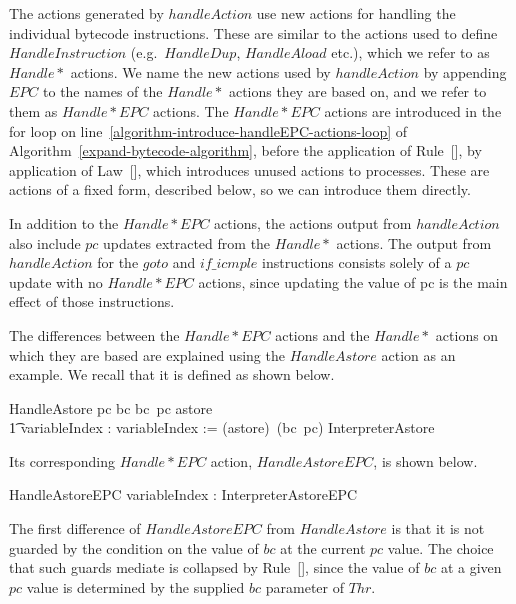 The actions generated by $handleAction$ use new actions for handling
the individual bytecode instructions.
These are similar to the actions used to define $HandleInstruction$
(e.g.\ $HandleDup$, $HandleAload$ etc.), which we refer to as
$Handle*$ actions.
We name the new actions used by $handleAction$ by appending $EPC$ to
the names of the $Handle*$ actions they are based on, and we refer to
them as $Handle{*}EPC$ actions.
The $Handle{*}EPC$ actions are introduced in the for loop on line~\ref{algorithm-introduce-handleEPC-actions-loop}
of Algorithm~\ref{expand-bytecode-algorithm}, before the application
of Rule~[], by application
of Law~[], which introduces unused actions
to processes.
These are actions of a fixed form, described below, so we can
introduce them directly.

In addition to the $Handle{*}EPC$ actions, the actions output from
$handleAction$ also include $pc$ updates extracted from the $Handle*$
actions.
The output from $handleAction$ for the $goto$ and $if\_icmple$
instructions consists solely of a $pc$ update with no $Handle{*}EPC$
actions, since updating the value of pc is the main effect of those
instructions.

The differences between the $Handle{*}EPC$ actions and the $Handle*$
actions on which they are based are explained using the $HandleAstore$
action as an example.
We recall that it is defined as shown below.
\begin{circusaction}
  HandleAstore \circdef \lcircguard pc \in \dom bc \land bc~pc \in \ran astore \rcircguard \circguard \\
  \t1 \circvar variableIndex : \nat \circspot variableIndex := (astore\inv)~(bc~pc) \circseq \lschexpract InterpreterAstore \rschexpract
\end{circusaction}
Its corresponding $Handle{*}EPC$ action, $HandleAstoreEPC$, is shown
below.
\begin{circusaction}
  HandleAstoreEPC \circdef \circval variableIndex : \nat \circspot \lschexpract InterpreterAstoreEPC \rschexpract
\end{circusaction}
The first difference of $HandleAstoreEPC$ from $HandleAstore$ is that
it is not guarded by the condition on the value of $bc$ at the current
$pc$ value.
The choice that such guards mediate is collapsed by
Rule~[], since the value of
$bc$ at a given $pc$ value is determined by the supplied $bc$
parameter of $Thr$.

